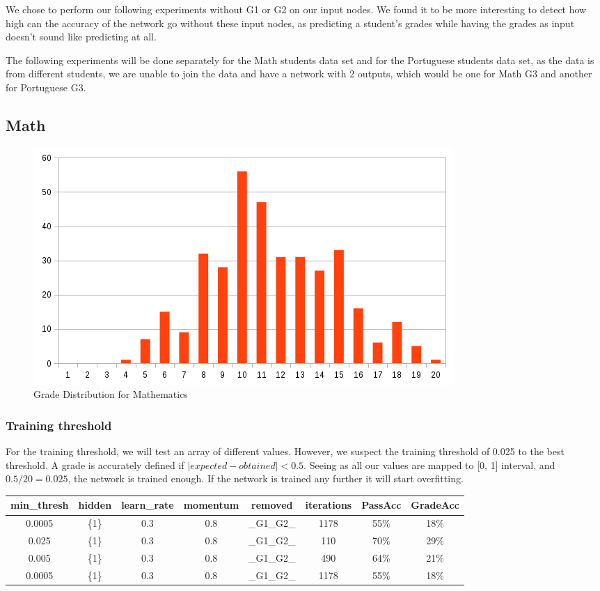 \documentclass[11pt]{article}
\begin{document}
We chose to perform our following experiments without G1 or G2 on our input nodes. We found it to be more interesting to detect how high can the accuracy of the network go without these input nodes, as predicting a student's grades while having the grades as input doesn't sound like predicting at all.

The following experiments will be done separately for the Math students data set and for the Portuguese students data set, as the data is from different students, we are unable to join the data and have a network with 2 outputs, which would be one for Math G3 and another for Portuguese G3.


\subsection{Math}
\begin{figure}[H]
\label{fig:Grade Distribution for Mathematics}
\includegraphics[scale=0.6]{mat-chart.png}
\centering
\caption{Grade Distribution for Mathematics}
\end{figure}

\subsubsection{Training threshold}
For the training threshold, we will test an array of different values. However, we suspect the training threshold of 0.025 to the best threshold. A grade is accurately defined if $|expected - obtained| < 0.5$. Seeing as all our values are mapped to [0, 1] interval, and $0.5 / 20 = 0.025$, the network is trained enough. If the network is trained any further it will start overfitting.

\begin{tabular}{| c | c | c | c | c | c | c | c |}
\hline \textbf{min\_thresh} & \textbf{hidden} & \textbf{learn\_rate} & \textbf{momentum} & \textbf{removed} & \textbf{iterations} & \textbf{PassAcc} & \textbf{GradeAcc}\\
\hline 0.0005 & \{1\} & 0.3 & 0.8 & \_G1\_G2\_ & 1178 & 55\% & 18\%\\
\hline 0.025 & \{1\} & 0.3 & 0.8 & \_G1\_G2\_ & 110 & 70\% & 29\%\\
\hline 0.005 & \{1\} & 0.3 & 0.8 & \_G1\_G2\_ & 490 & 64\% & 21\%\\
\hline 0.0005 & \{1\} & 0.3 & 0.8 & \_G1\_G2\_ & 1178 & 55\% & 18\%\\
\hline
\end{tabular}
\end{document}
